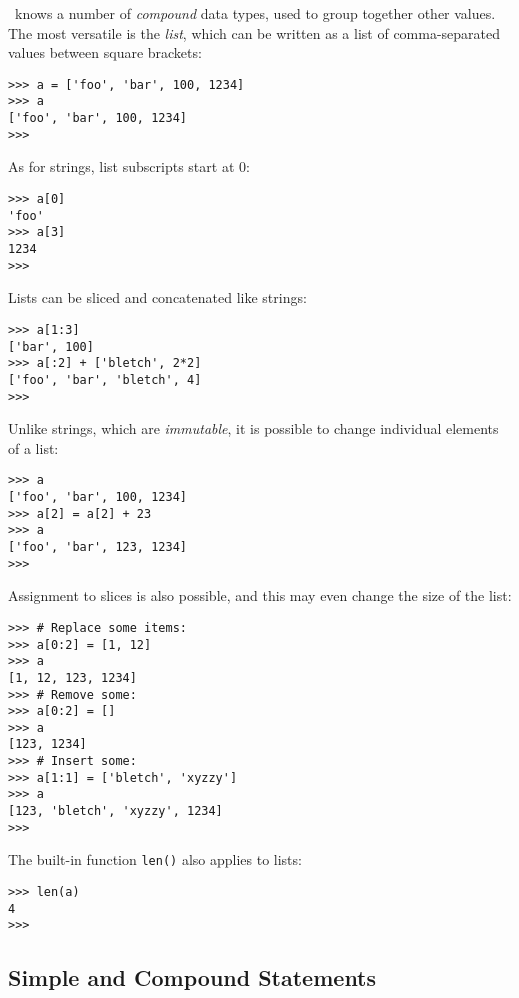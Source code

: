 \Python\ knows a number of
{\it compound}
data types, used to group together other values.
The most versatile is the
{\it list},
which can be written as a list of comma-separated values between square
brackets:
\begin{code}\begin{verbatim}
>>> a = ['foo', 'bar', 100, 1234]
>>> a
['foo', 'bar', 100, 1234]
>>> 
\end{verbatim}\end{code}
As for strings, list subscripts start at 0:
\begin{code}\begin{verbatim}
>>> a[0]
'foo'
>>> a[3]
1234
>>> 
\end{verbatim}\end{code}
Lists can be sliced and concatenated like strings:
\begin{code}\begin{verbatim}
>>> a[1:3]
['bar', 100]
>>> a[:2] + ['bletch', 2*2]
['foo', 'bar', 'bletch', 4]
>>> 
\end{verbatim}\end{code}
Unlike strings, which are
{\it immutable},
it is possible to change individual elements of a list:
\begin{code}\begin{verbatim}
>>> a
['foo', 'bar', 100, 1234]
>>> a[2] = a[2] + 23
>>> a
['foo', 'bar', 123, 1234]
>>>
\end{verbatim}\end{code}
Assignment to slices is also possible, and this may even change the size
of the list:
\begin{code}\begin{verbatim}
>>> # Replace some items:
>>> a[0:2] = [1, 12]
>>> a
[1, 12, 123, 1234]
>>> # Remove some:
>>> a[0:2] = []
>>> a
[123, 1234]
>>> # Insert some:
>>> a[1:1] = ['bletch', 'xyzzy']
>>> a
[123, 'bletch', 'xyzzy', 1234]
>>> 
\end{verbatim}\end{code}
The built-in function {\tt len()} also applies to lists:
\begin{code}\begin{verbatim}
>>> len(a)
4
>>> 
\end{verbatim}\end{code}

\subsection{Simple and Compound Statements}

